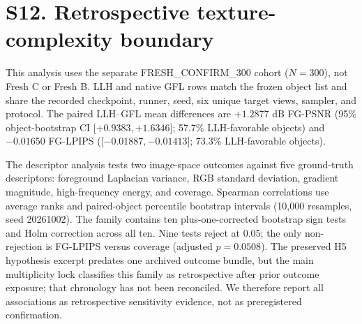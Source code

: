 \documentclass[11pt]{article}
\begin{document}
\section*{S12. Retrospective texture-complexity boundary}
This analysis uses the separate FRESH\_CONFIRM\_300 cohort ($N=300$), not Fresh C or Fresh B. LLH and native GFL rows match the frozen object list and share the recorded checkpoint, runner, seed, six unique target views, sampler, and protocol. The paired LLH--GFL mean differences are $+1.2877$ dB FG-PSNR (95\% object-bootstrap CI [$+0.9383,+1.6346$]; 57.7\% LLH-favorable objects) and $-0.01650$ FG-LPIPS ([$-0.01887,-0.01413$]; 73.3\% LLH-favorable objects).

The descriptor analysis tests two image-space outcomes against five ground-truth descriptors: foreground Laplacian variance, RGB standard deviation, gradient magnitude, high-frequency energy, and coverage. Spearman correlations use average ranks and paired-object percentile bootstrap intervals (10,000 resamples, seed 20261002). The family contains ten plus-one-corrected bootstrap sign tests and Holm correction across all ten. Nine tests reject at 0.05; the only non-rejection is FG-LPIPS versus coverage (adjusted $p=0.0508$). The preserved H5 hypothesis excerpt predates one archived outcome bundle, but the main multiplicity lock classifies this family as retrospective after prior outcome exposure; that chronology has not been reconciled. We therefore report all associations as retrospective sensitivity evidence, not as preregistered confirmation.
\end{document}
